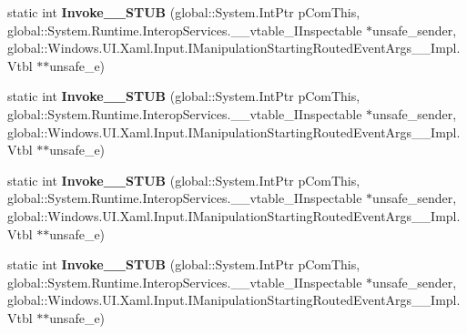 \begin{DoxyCompactItemize}
\item 
\mbox{\label{struct_windows_1_1_u_i_1_1_xaml_1_1_input_1_1_manipulation_starting_event_handler_____impl_1_1_vtbl_a0f833e096d8a14b333dfe64700db31cd}} 
static int {\bfseries Invoke\+\_\+\+\_\+\+S\+T\+UB} (global\+::\+System.\+Int\+Ptr p\+Com\+This, global\+::\+System.\+Runtime.\+Interop\+Services.\+\_\+\+\_\+vtable\+\_\+\+I\+Inspectable $\ast$unsafe\+\_\+sender, global\+::\+Windows.\+U\+I.\+Xaml.\+Input.\+I\+Manipulation\+Starting\+Routed\+Event\+Args\+\_\+\+\_\+\+Impl.\+Vtbl $\ast$$\ast$unsafe\+\_\+e)
\item 
\mbox{\label{struct_windows_1_1_u_i_1_1_xaml_1_1_input_1_1_manipulation_starting_event_handler_____impl_1_1_vtbl_a0f833e096d8a14b333dfe64700db31cd}} 
static int {\bfseries Invoke\+\_\+\+\_\+\+S\+T\+UB} (global\+::\+System.\+Int\+Ptr p\+Com\+This, global\+::\+System.\+Runtime.\+Interop\+Services.\+\_\+\+\_\+vtable\+\_\+\+I\+Inspectable $\ast$unsafe\+\_\+sender, global\+::\+Windows.\+U\+I.\+Xaml.\+Input.\+I\+Manipulation\+Starting\+Routed\+Event\+Args\+\_\+\+\_\+\+Impl.\+Vtbl $\ast$$\ast$unsafe\+\_\+e)
\item 
\mbox{\label{struct_windows_1_1_u_i_1_1_xaml_1_1_input_1_1_manipulation_starting_event_handler_____impl_1_1_vtbl_a0f833e096d8a14b333dfe64700db31cd}} 
static int {\bfseries Invoke\+\_\+\+\_\+\+S\+T\+UB} (global\+::\+System.\+Int\+Ptr p\+Com\+This, global\+::\+System.\+Runtime.\+Interop\+Services.\+\_\+\+\_\+vtable\+\_\+\+I\+Inspectable $\ast$unsafe\+\_\+sender, global\+::\+Windows.\+U\+I.\+Xaml.\+Input.\+I\+Manipulation\+Starting\+Routed\+Event\+Args\+\_\+\+\_\+\+Impl.\+Vtbl $\ast$$\ast$unsafe\+\_\+e)
\item 
\mbox{\label{struct_windows_1_1_u_i_1_1_xaml_1_1_input_1_1_manipulation_starting_event_handler_____impl_1_1_vtbl_a0f833e096d8a14b333dfe64700db31cd}} 
static int {\bfseries Invoke\+\_\+\+\_\+\+S\+T\+UB} (global\+::\+System.\+Int\+Ptr p\+Com\+This, global\+::\+System.\+Runtime.\+Interop\+Services.\+\_\+\+\_\+vtable\+\_\+\+I\+Inspectable $\ast$unsafe\+\_\+sender, global\+::\+Windows.\+U\+I.\+Xaml.\+Input.\+I\+Manipulation\+Starting\+Routed\+Event\+Args\+\_\+\+\_\+\+Impl.\+Vtbl $\ast$$\ast$unsafe\+\_\+e)

\end{DoxyCompactItemize}
